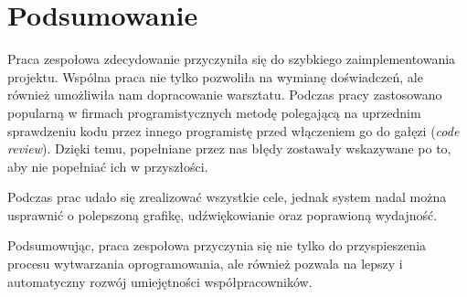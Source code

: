\section{Podsumowanie}
Praca zespołowa zdecydowanie przyczyniła się do szybkiego zaimplementowania projektu. Wspólna praca nie tylko pozwoliła na wymianę doświadczeń, ale również umożliwiła nam dopracowanie warsztatu. Podczas pracy zastosowano popularną w firmach programistycznych metodę polegającą na uprzednim sprawdzeniu kodu przez innego programistę przed włączeniem go do gałęzi (\emph{code review}). Dzięki temu, popełniane przez nas błędy zostawały wskazywane po to, aby nie popełniać ich w przyszłości.

Podczas prac udało się zrealizować wszystkie cele, jednak system nadal można usprawnić o polepszoną grafikę, udźwiękowianie oraz poprawioną wydajność.

Podsumowując, praca zespołowa przyczynia się nie tylko do przyspieszenia procesu wytwarzania oprogramowania, ale również pozwala na lepszy i automatyczny rozwój umiejętności współpracowników.
\pagebreak
